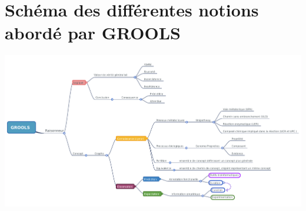 \chapter{Schéma des différentes notions abordé par GROOLS}

\begin{shadedfigure}
	\centering
	\includegraphics[width=\textwidth]{img/GROOLS_mindmap.pdf}
	\caption{  }
	\label{fig:GROOLS_mindmap}
\end{shadedfigure}
